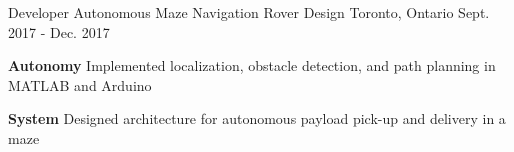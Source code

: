 \begin{cventries}
	\cventry
	{Developer}
	{Autonomous Maze Navigation Rover Design}
	{Toronto, Ontario}
	{Sept. 2017 - Dec. 2017}
	{
		\begin{cvitems}
			\item { \textbf{Autonomy} Implemented localization, obstacle detection, and path planning in MATLAB and Arduino}
			\item { \textbf{System} Designed architecture for autonomous payload pick-up and delivery in a maze}
		\end{cvitems}
	}
\end{cventries}



